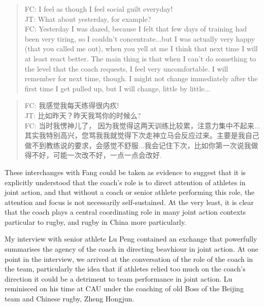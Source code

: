 \begin{CJK}{UTF8}{gbsn}
    \begin{quotation}
      FC: I feel as though I feel social guilt everyday! \\
      JT: What about yesterday, for example? \\
      FC: Yesterday I was dazed, because I felt that few days of training had been very tiring, so I couldn't concentrate...but I was actually very happy (that you called me out), when you yell at me I think that next time I will at least react better.  The main thing is that when I can't do something to the level that the coach requests, I feel very uncomfortable.  I will remember for next time, though.  I might not change immediately after the first time I get pulled up, but I will change, little by little... \\
    \end{quotation}

    \begin{quotation}
      FC: 我感觉我每天练得很内疚! \\
      JT: 比如昨天？昨天我骂你的时候么? \\
      FC: 当时我愣神儿了， 因为我觉得这两天训练比较累，注意力集中不起来...其实我特别高兴，您骂我我就觉得下次走神立马会反应过来。主要是我自己做不到教练说的要求，会感觉不舒服...我会记住下次，比如你第一次说我做得不好，可能一次改不好，一点一点会改好.
    \end{quotation}

These interchanges with Fang could be taken as evidence to suggest that it is explicitly understood that the coach's role is to direct attention of athletes in joint action, and that without a coach or senior athlete performing this role, the attention and focus is not necessarily self-sustained. At the very least, it is clear that the coach plays a central coordinating role in many joint action contexts particular to rugby, and rugby in China more particularly.


My interview with senior athlete Lu Peng contained an exchange that powerfully summarises the agency of the coach in directing beavhiour in joint action.  At one point in the interview, we arrived at the conversation of the role of the coach in the team, particularly the idea that if athletes relied too much on the coach's direction it could be a detriment to team performance in joint action.  Lu reminisced on his time at CAU under the coaching of old Boss of the Beijing team and Chinese rugby, Zheng Hongjun.


\end{CJK}

